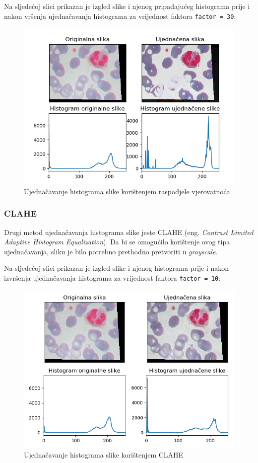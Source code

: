 \documentclass[12pt,a4paper]{article}
\begin{document}
Na sljedećoj slici prikazan je izgled slike i njenog pripadajućeg histograma prije i nakon vršenja ujednačavanja histograma za vrijednost faktora \texttt{factor = 30}:

\begin{figure}[H]

\center
\includegraphics[scale=0.9]{s9Histogram1.png}
\caption{Ujednačavanje histograma slike korištenjem raspodjele vjerovatnoća}

\end{figure}

\subsubsection{CLAHE}

Drugi metod ujednačavanja histograma slike jeste CLAHE (eng. \textit{Contrast Limited Adaptive Histogram Equalization}). Da bi se omogućilo korištenje ovog tipa ujednačavanja, sliku je bilo potrebno prethodno pretvoriti u \textit{grayscale}.

Na sljedećoj slici prikazan je izgled slike i njenog histograma prije i nakon izvršenja ujednačavanja histograma za vrijednost faktora \texttt{factor = 10}:

\begin{figure}[H]

	\center
	\includegraphics[scale=0.9]{s9Histogram2.png}
	\caption{Ujednačavanje histograma slike korištenjem CLAHE}
	
\end{figure}
\end{document}
